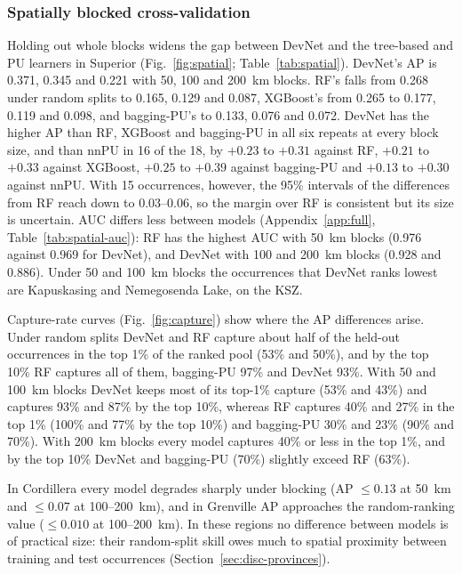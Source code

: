 \documentclass[pdflatex,sn-apa]{sn-jnl}
\begin{document}
\subsubsection{Spatially blocked cross-validation}\label{sec:res-spatial}

Holding out whole blocks widens the gap between DevNet and the tree-based and PU learners in Superior (Fig.~\ref{fig:spatial}; Table~\ref{tab:spatial}). DevNet's AP is 0.371, 0.345 and 0.221 with 50, 100 and 200~km blocks. RF's falls from 0.268 under random splits to 0.165, 0.129 and 0.087, XGBoost's from 0.265 to 0.177, 0.119 and 0.098, and bagging-PU's to 0.133, 0.076 and 0.072. DevNet has the higher AP than RF, XGBoost and bagging-PU in all six repeats at every block size, and than nnPU in 16 of the 18, by $+0.23$ to $+0.31$ against RF, $+0.21$ to $+0.33$ against XGBoost, $+0.25$ to $+0.39$ against bagging-PU and $+0.13$ to $+0.30$ against nnPU. With 15 occurrences, however, the 95\% intervals of the differences from RF reach down to 0.03--0.06, so the margin over RF is consistent but its size is uncertain. AUC differs less between models (Appendix~\ref{app:full}, Table~\ref{tab:spatial-auc}): RF has the highest AUC with 50~km blocks (0.976 against 0.969 for DevNet), and DevNet with 100 and 200~km blocks (0.928 and 0.886). Under 50 and 100~km blocks the occurrences that DevNet ranks lowest are Kapuskasing and Nemegosenda Lake, on the KSZ.

Capture-rate curves (Fig.~\ref{fig:capture}) show where the AP differences arise. Under random splits DevNet and RF capture about half of the held-out occurrences in the top 1\% of the ranked pool (53\% and 50\%), and by the top 10\% RF captures all of them, bagging-PU 97\% and DevNet 93\%. With 50 and 100~km blocks DevNet keeps most of its top-1\% capture (53\% and 43\%) and captures 93\% and 87\% by the top 10\%, whereas RF captures 40\% and 27\% in the top 1\% (100\% and 77\% by the top 10\%) and bagging-PU 30\% and 23\% (90\% and 70\%). With 200~km blocks every model captures 40\% or less in the top 1\%, and by the top 10\% DevNet and bagging-PU (70\%) slightly exceed RF (63\%).

In Cordillera every model degrades sharply under blocking (AP $\leq 0.13$ at 50~km and $\leq 0.07$ at 100--200~km), and in Grenville AP approaches the random-ranking value ($\leq 0.010$ at 100--200~km). In these regions no difference between models is of practical size: their random-split skill owes much to spatial proximity between training and test occurrences (Section~\ref{sec:disc-provinces}).
\end{document}
